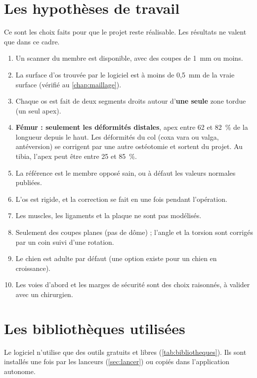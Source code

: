 \section{Les hypothèses de travail}
\label{sec:hypotheses}

Ce sont les choix faits pour que le projet reste réalisable. Les résultats ne valent que dans ce cadre.
\begin{enumerate}
  \item Un scanner du membre est disponible, avec des coupes de 1~mm ou moins.
  \item La surface d'os trouvée par le logiciel est à moins de 0,5~mm de la vraie surface (vérifié au
  \cref{chap:maillage}).
  \item Chaque os est fait de deux segments droits autour d'\textbf{une seule} zone tordue (un seul apex).
  \item \textbf{Fémur : seulement les déformités distales}, apex entre 62 et 82~\% de la longueur depuis le haut.
  Les déformités du col (coxa vara ou valga, antéversion) se corrigent par une autre ostéotomie et sortent du projet.
  Au tibia, l'apex peut être entre 25 et 85~\%.
  \item La référence est le membre opposé sain, ou à défaut les valeurs normales publiées.
  \item L'os est rigide, et la correction se fait en une fois pendant l'opération.
  \item Les muscles, les ligaments et la plaque ne sont pas modélisés.
  \item Seulement des coupes planes (pas de dôme) ; l'angle et la torsion sont corrigés par un coin suivi d'une
  rotation.
  \item Le chien est adulte par défaut (une option existe pour un chien en croissance).
  \item Les voies d'abord et les marges de sécurité sont des choix raisonnés, à valider avec un chirurgien.
\end{enumerate}

\section{Les bibliothèques utilisées}

Le logiciel n'utilise que des outils gratuits et libres (\cref{tab:bibliotheques}). Ils sont installés une fois par
les lanceurs (\cref{sec:lancer}) ou copiés dans l'application autonome.

